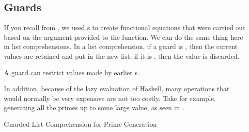 \subsection{Guards}\label{subsec:List_Comprehension_Guards}
If you recall from , we used s to create functional equations that were carried out based on the argument provided to the function.
We can do the same thing here in list comprehensions.
In a list comprehension, if a guard is , then the current values are retained and put in the new list; if it is , then the value is discarded.

\begin{blackbox}
  {\large{A guard can restrict values made by earlier s.}}
\end{blackbox}

In addition, because of the lazy evaluation of Haskell, many operations that would normally be very expensive are not too costly.
Take for example, generating all the primes up to some large value, as seen in .
\begin{listing}[h!tbp]
\caption{Guarded List Comprehension for Prime Generation}
\label{lst:List_Comprehension_Guards}
\end{listing}

